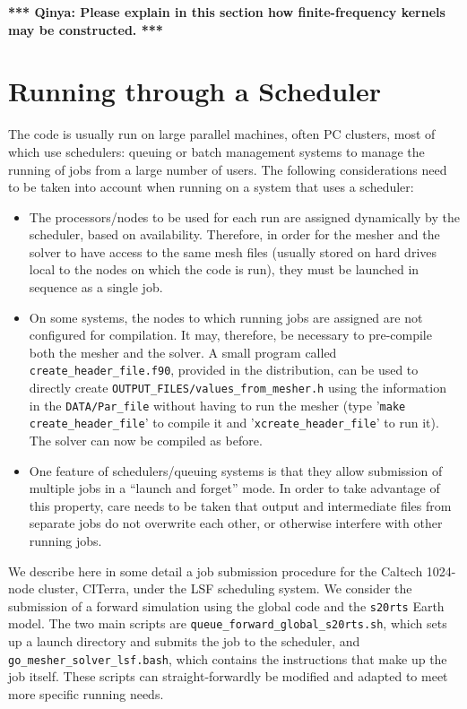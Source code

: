 \documentclass[onecolumn]{article}
\newcommand{\toqinya}[1]{\textbf{*** Qinya: #1 ***}}
\begin{document}
\toqinya{Please explain in this section how finite-frequency kernels
may be constructed.}

\section{Running through a Scheduler}
\label{section:scheduler}

The code is usually run on large parallel machines, often PC clusters,
most of which use schedulers: queuing or batch management systems to manage
the running of jobs from a large number of users.
The following considerations need to be taken into account when running on
a system that uses a scheduler:
\begin{itemize}
\item The processors/nodes to be used for each run are assigned dynamically
by the scheduler, based on availability.
Therefore, in order for the mesher and the solver to have access to the same
mesh files (usually stored on hard drives local to the nodes on which the
code is run), they must be launched in sequence as a single job.  
\item On some systems, the nodes to which running jobs are assigned are
not configured for compilation.
It may, therefore, be necessary to pre-compile both the mesher and the solver.
A small program called \texttt{create\_header\_file.f90}, provided in the
distribution, can be used to directly create
\texttt{OUTPUT\_FILES/values\_from\_mesher.h} using the information in
the \texttt{DATA/Par\_file} without having to run the mesher
(type '\texttt{make create\_header\_file}' to compile it
and '\texttt{xcreate\_header\_file}' to run it).
The solver can now be compiled as before.
\item One feature of schedulers/queuing systems is that they allow
submission of multiple jobs in a ``launch and forget'' mode.
In order to take advantage of this property, care needs to be taken that
output and intermediate files from separate jobs do not overwrite each other,
or otherwise interfere with other running jobs.
\end{itemize}

We describe here in some detail a job submission procedure for the
Caltech 1024-node cluster, CITerra, under the LSF scheduling system.
We consider the submission of a forward simulation using the global
code and the \texttt{s20rts} Earth model.
The two main scripts are \texttt{queue\_forward\_global\_s20rts.sh},
which sets up a launch directory and submits the job to the scheduler,
and \texttt{go\_mesher\_solver\_lsf.bash}, which contains the instructions
that make up the job itself.
These scripts can straight-forwardly be modified and adapted to meet
more specific running needs.
\end{document}
